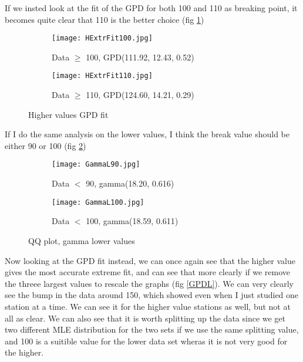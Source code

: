 \documentclass{article}
\begin{document}
	If we insted look at the fit of the GPD for both 100 and 110 as breaking point, it becomes quite clear that 110 is the better choice (fig \ref{GPDH})
	
	\begin{figure}[H]
		\centering
		\begin{subfigure}{0.5\textwidth}
			\centering
			\texttt{[image: HExtrFit100.jpg]}
			\caption{Data $\geq$ 100, GPD(111.92, 12.43, 0.52)}
		\end{subfigure}%
		\begin{subfigure}{0.5\textwidth}
			\centering
			\texttt{[image: HExtrFit110.jpg]}
			\caption{Data $\geq$ 110, GPD(124.60, 14.21, 0.29)}
		\end{subfigure}
		\caption{Higher values GPD fit}
		\label{GPDH}
	\end{figure}
	
	If I do the same analysis on the lower values, I think the break value should be either 90 or 100 (fig \ref{GammaL})
	
	\begin{figure}[H]
		\centering
		\begin{subfigure}{0.5\textwidth}
			\centering
			\texttt{[image: GammaL90.jpg]}
			\caption{Data $<$ 90, gamma(18.20, 0.616)}
		\end{subfigure}%
		\begin{subfigure}{0.5\textwidth}
			\centering
			\texttt{[image: GammaL100.jpg]}
			\caption{Data $<$ 100, gamma(18.59, 0.611)}
		\end{subfigure}
		\caption{QQ plot, gamma lower values}
		\label{GammaL}
	\end{figure}
	
	Now looking at the GPD fit instead, we can once again see that the higher value gives the most accurate extreme fit, and can see that more clearly if we remove the threee largest values to rescale the graphs (fig \ref{GPDL}). We can very clearly see the bump in the data around 150, which showed even when I just studied one station at a time. We can see it for the higher value stations as well, but not at all as clear. We can also see that it is worth splitting up the data since we get two different MLE distribution for the two sets if we use the same splitting value, and 100 is a suitible value for the lower data set wheras it is not very good for the higher. 
	
\end{document}
